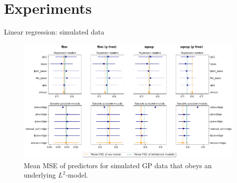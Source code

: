 \documentclass[10pt, english, professionalfonts]{beamer}
\begin{document}

\section{Experiments}

%

\begin{frame}{Linear regression: simulated data}
  \vspace{1em}
  \begin{figure}
    \includegraphics[width=\textwidth]{img/reg_emcee_l2}
    \caption{Mean MSE of predictors for simulated GP data that obeys an underlying \(L^2\)-model.}
  \end{figure}
\end{frame}
\end{document}
